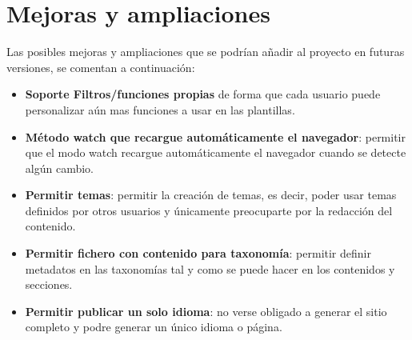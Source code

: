 \section{Mejoras y ampliaciones}

Las posibles mejoras y ampliaciones que se podrían añadir al proyecto en futuras versiones, se comentan
a continuación:

\begin{itemize}
    \item \textbf{Soporte Filtros/funciones propias} de forma que cada usuario puede personalizar aún mas
    funciones a usar en las plantillas.
    \item \textbf{Método watch que recargue automáticamente el navegador}: permitir que el modo watch recargue
    automáticamente el navegador cuando se detecte algún cambio.
    \item \textbf{Permitir temas}: permitir la creación de temas, es decir, poder usar temas definidos
    por otros usuarios y únicamente preocuparte por la redacción del contenido.
    \item \textbf{Permitir fichero con contenido para taxonomía}: permitir definir metadatos en las taxonomías
    tal y como se puede hacer en los contenidos y secciones.
    \item \textbf{Permitir publicar un solo idioma}: no verse obligado a generar el sitio completo y podre generar
    un único idioma o página.
\end{itemize}
